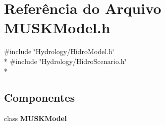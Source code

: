 \section{Referência do Arquivo M\+U\+S\+K\+Model.\+h}
\label{_m_u_s_k_model_8h}
{\ttfamily \#include \char`\"{}Hydrology/\+Hidro\+Model.\+h\char`\"{}}\\*
{\ttfamily \#include \char`\"{}Hydrology/\+Hidro\+Scenario.\+h\char`\"{}}\\*
\subsection*{Componentes}
\begin{DoxyCompactItemize}
\item 
class {\bf M\+U\+S\+K\+Model}
\end{DoxyCompactItemize}
